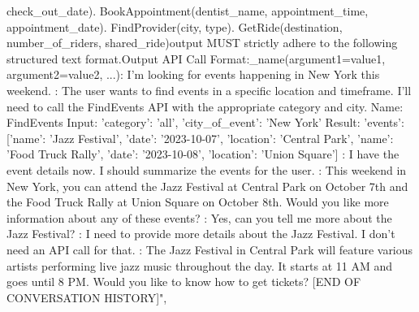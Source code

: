 check_out_date). BookAppointment(dentist_name, appointment_time, appointment_date). FindProvider(city, type). GetRide(destination, number_of_riders, shared_ride)\n{}\nThe output MUST strictly adhere to the following structured text format.\nExample Output API Call Format:\nfunction_name(argument1=value1, argument2=value2, ...)\n\n{}\n\nUser: I'm looking for events happening in New York this weekend.  \nThought: The user wants to find events in a specific location and timeframe. I'll need to call the FindEvents API with the appropriate category and city.  \nAPI Name: FindEvents  \nAPI Input: {'category': 'all', 'city_of_event': 'New York'}  \nAPI Result: {'events': [{'name': 'Jazz Festival', 'date': '2023-10-07', 'location': 'Central Park'}, {'name': 'Food Truck Rally', 'date': '2023-10-08', 'location': 'Union Square'}]}  \nThought: I have the event details now. I should summarize the events for the user.  \nSystem: This weekend in New York, you can attend the Jazz Festival at Central Park on October 7th and the Food Truck Rally at Union Square on October 8th. Would you like more information about any of these events?  \n\nUser: Yes, can you tell me more about the Jazz Festival?  \nThought: I need to provide more details about the Jazz Festival. I don't need an API call for that.  \nSystem: The Jazz Festival in Central Park will feature various artists performing live jazz music throughout the day. It starts at 11 AM and goes until 8 PM. Would you like to know how to get tickets?  [END OF CONVERSATION HISTORY]",
